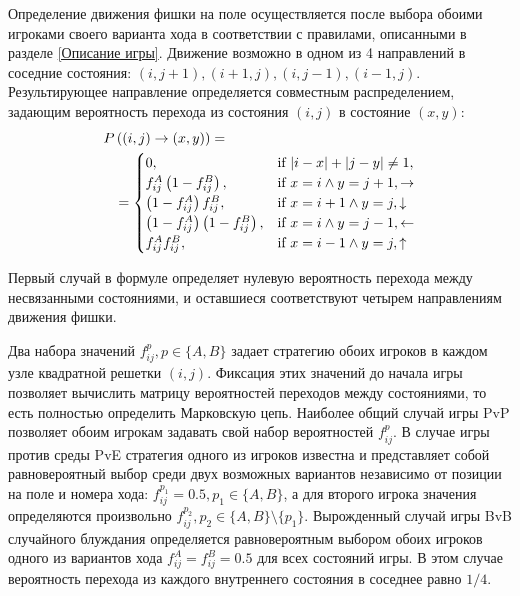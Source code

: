 Определение движения фишки на поле осуществляется после выбора обоими игроками своего варианта хода в соответствии с правилами,
описанными в разделе \cref{Описание игры}. Движение возможно в одном из 4 направлений в соседние состояния:
$(i, j + 1), (i + 1, j), (i, j - 1), (i - 1, j)$. Результирующее направление определяется совместным распределением, 
задающим вероятность перехода из состояния $(i, j)$ в состояние $(x, y)$:
\begin{equation}
    \begin{aligned}
    P& \left( (i, j) \rightarrow (x, y) \right) = \\
    &=\begin{cases}
        0, &\mbox{if } |i-x|+|j-y| \neq 1,\\ 
        f_{ij}^A \left(1-f_{ij}^B\right), &\mbox{if } x=i \land y=j+1, {\bf \rightarrow}\\
        \left(1-f_{ij}^A\right) f_{ij}^B, &\mbox{if } x=i+1 \land y=j, {\bf \downarrow}\\
        \left(1-f_{ij}^A\right) \left(1-f_{ij}^B\right), &\mbox{if } x=i \land y=j-1, {\bf \leftarrow}\\
        f_{ij}^A f_{ij}^B, &\mbox{if } x=i-1 \land y=j, {\bf \uparrow}\\
    \end{cases}
    \label{eq:transition}
    \end{aligned}
\end{equation}

Первый случай в формуле определяет нулевую вероятность перехода между несвязанными состояниями, и оставшиеся соответствуют четырем направлениям движения фишки.

Два набора значений $f_{ij}^p, p \in \{A, B\}$ задает стратегию обоих игроков в каждом узле квадратной решетки $(i, j)$. 
Фиксация этих значений до начала игры позволяет вычислить матрицу вероятностей переходов между состояниями, то есть полностью определить Марковскую цепь.
Наиболее общий случай игры PvP позволяет обоим игрокам задавать свой набор вероятностей $f_{ij}^p$. В случае игры против среды PvE
стратегия одного из игроков известна и представляет собой равновероятный выбор среди двух возможных вариантов независимо от позиции на поле и номера хода:
$f_{ij}^{p_1} = 0.5, p_1 \in \{A, B\}$, а для второго игрока значения определяются произвольно $f_{ij}^{p_2}, p_2 \in \{A, B\} \setminus \{p_1\}$. 
Вырожденный случай игры BvB случайного блуждания определяется равновероятным выбором обоих игроков одного из вариантов хода $f_{ij}^{A} = f_{ij}^{B} = 0.5$
для всех состояний игры. В этом случае вероятность перехода из каждого внутреннего состояния в соседнее равно $1/4$.

